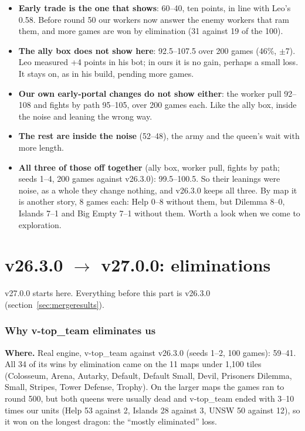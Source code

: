 \documentclass[11pt,a4paper]{article}
\begin{document}
\begin{itemize}
      \item \textbf{Early trade is the one that shows}: 60--40, ten points, in line with Leo's 0.58. Before round 50 our
            workers now answer the enemy workers that ram them, and more games are won by elimination (31 against 19 of the
            100).
      \item \textbf{The ally box does not show here}: 92.5--107.5 over 200 games (46\%, $\pm$7). Leo measured +4 points in
            his bot; in ours it is no gain, perhaps a small loss. It stays on, as in his build, pending more games.
      \item \textbf{Our own early-portal changes do not show either}: the worker pull 92--108 and fights by path 95--105, over
            200 games each. Like the ally box, inside the noise and leaning the wrong way.
      \item \textbf{The rest are inside the noise} (52--48), the army and the queen's wait with more length.
      \item \textbf{All three of those off together} (ally box, worker pull, fights by path; seeds 1--4, 200 games against
            v26.3.0): 99.5--100.5. So their leanings were noise, as a whole they change nothing, and v26.3.0 keeps all three.
            By map it is another story, 8 games each: Help 0--8 without them, but Dilemma 8--0, Islands 7--1 and Big Empty
            7--1 without them. Worth a look when we come to exploration.
\end{itemize}


\part{v26.3.0 $\rightarrow$ v27.0.0: eliminations}
v27.0.0 starts here. Everything before this part is v26.3.0 (section~\ref{sec:mergeresults}).

\section{Why v-top\_team eliminates us}\label{sec:whyelim}
\textbf{Where.} Real engine, v-top\_team against v26.3.0 (seeds 1--2, 100 games): 59--41. All 34 of its wins by elimination
came on the 11 maps under 1,100 tiles (Colosseum, Arena, Autarky, Default, Default Small, Devil, Prisoners Dilemma, Small,
Stripes, Tower Defense, Trophy). On the larger maps the games ran to round 500, but both queens were usually dead and
v-top\_team ended with 3--10 times our units (Help 53 against 2, Islands 28 against 3, UNSW 50 against 12), so it won on
the longest dragon: the ``mostly eliminated'' loss.
\end{document}
